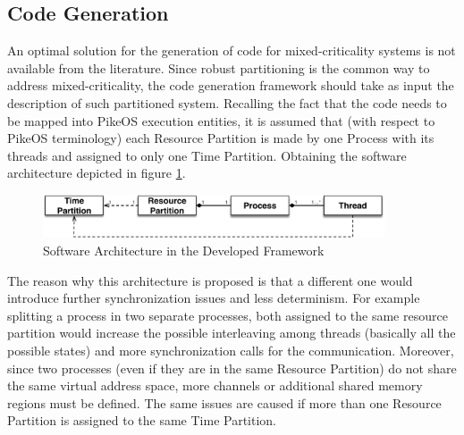 \subsection{Code Generation}
An optimal solution for the generation of code for mixed-criticality systems is not available from the literature. Since robust partitioning is the common way to address mixed-criticality, the code generation framework should take as input the description of such partitioned system. Recalling the fact that the code needs to be mapped into PikeOS execution entities, it is assumed that (with respect to PikeOS terminology) each Resource Partition is made by one Process with its threads and assigned to only one Time Partition. Obtaining the software architecture depicted in figure \ref{fig:SWArchitecture}.
\begin{figure}[htbp] 
\centering    
\includegraphics[width=0.9\textwidth]{SWArchitecture}
\caption{Software Architecture in the Developed Framework}
\label{fig:SWArchitecture}
\end{figure}
The reason why this architecture is proposed is that a different one would introduce further synchronization issues and less determinism. For example splitting a process in two separate processes, both assigned to the same resource partition would increase the possible interleaving among threads (basically all the possible states) and more synchronization calls for the communication. Moreover, since two processes (even if they are in the same Resource Partition) do not share the same virtual address space, more channels or additional shared memory regions must be defined. The same issues are caused if more than one Resource Partition is assigned to the same Time Partition.

